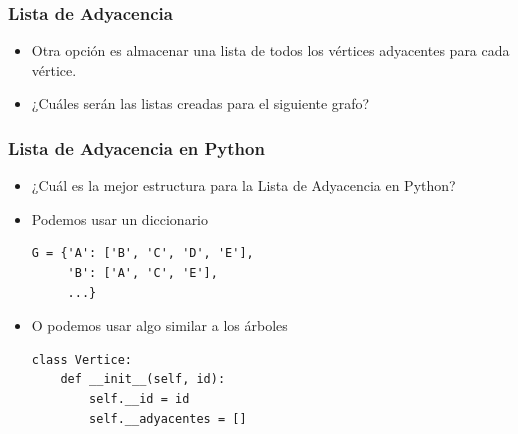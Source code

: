 \documentclass[11pt]{beamer}
\begin{document}
\begin{frame}\frametitle{Lista de Adyacencia}
\begin{itemize}
\item Otra opción es almacenar una lista de todos los vértices adyacentes para cada vértice.
\pause
\item ¿Cuáles serán las listas creadas para el siguiente grafo?
\end{itemize}
\begin{center}
\end{center}
\end{frame}



\begin{frame}[fragile]\frametitle{Lista de Adyacencia en Python}
\begin{itemize}
\item ¿Cuál es la mejor estructura para la Lista de Adyacencia en Python?
\pause
\item Podemos usar un diccionario
\begin{lstlisting}
G = {'A': ['B', 'C', 'D', 'E'], 
     'B': ['A', 'C', 'E'],
     ...}
\end{lstlisting}
\pause
\item O podemos usar algo similar a los árboles
\begin{lstlisting}
class Vertice:
    def __init__(self, id):
        self.__id = id
        self.__adyacentes = []
\end{lstlisting}
\end{itemize}
\end{frame}
\end{document}
